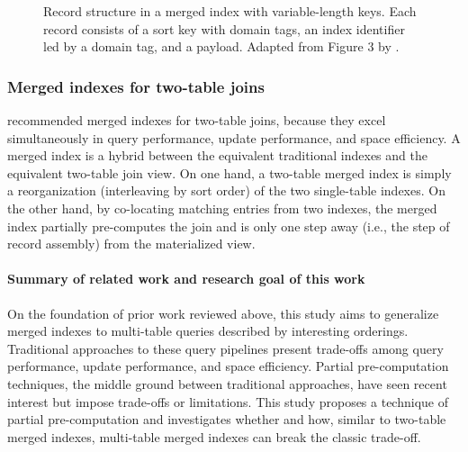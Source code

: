 \documentclass[sigconf, pdfa, nonacm]{acmart}
\newcommand\summary[1]{\paragraph{\textbf{#1}}}
\begin{document}
\begin{figure}[htbp]
    \caption{Record structure in a merged index with variable-length keys. \textnormal{
    Each record consists of a sort key with domain tags, an index identifier led by a domain tag, and a payload.
    Adapted from Figure 3 by \citet{graefe2007merged}.
    }}\label{fig:record_structure}
\end{figure}

\subsubsection{Merged indexes for two-table joins}
\citet{lyu2025indexing} recommended merged indexes for two-table joins, because they excel simultaneously in query performance, update performance, and space efficiency.
A merged index is a hybrid between the equivalent traditional indexes and the equivalent two-table join view. On one hand, a two-table merged index is simply a reorganization (interleaving by sort order) of the two single-table indexes. On the other hand, by co-locating matching entries from two indexes, the merged index partially pre-computes the join and is only one step away (i.e., the step of record assembly) from the materialized view.

\summary{Summary of related work and research goal of this work}\label{para:research_goal} 
On the foundation of prior work reviewed above, this study aims to generalize merged indexes to multi-table queries described by interesting orderings.
Traditional approaches to these query pipelines present trade-offs among query performance, update performance, and space efficiency.
Partial pre-computation techniques, the middle ground between traditional approaches, have seen recent interest but impose trade-offs or limitations.
This study proposes a technique of partial pre-computation and investigates whether and how, similar to two-table merged indexes, multi-table merged indexes can break the classic trade-off.
\end{document}
